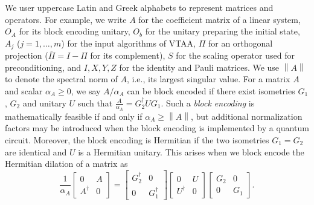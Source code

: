 \documentclass[letterpaper,onecolumn,11pt,accepted=2026-02-14]{quantumarticle}
\newcommand{\norm}[1]{\left\lVert#1\right\rVert}
\theoremstyle{remark}
\theoremstyle{plain}
\begin{document}
We user uppercase Latin and Greek alphabets to represent matrices and operators. For example, we write $A$ for the coefficient matrix of a linear system, $O_A$ for its block encoding unitary, $O_b$ for the unitary preparing the initial state, $A_j$ ($j=1,\ldots,m$) for the input algorithms of VTAA, $\Pi$ for an orthogonal projection ($\overline{\Pi}=I-\Pi$ for its complement), $S$ for the scaling operator used for preconditioning, and $I,X,Y,Z$ for the identity and Pauli matrices. We use $\norm{A}$ to denote the spectral norm of $A$, i.e., its largest singular value.
For a matrix $A$ and scalar $\alpha_A\geq 0$, we say $A/\alpha_A$ can be block encoded if there exist isometries $G_1$, $G_2$ and unitary $U$ such that $\frac{A}{\alpha_A}=G_2^\dagger UG_1$. Such a \emph{block encoding} is mathematically feasible if and only if $\alpha_A\geq\norm{A}$, but additional normalization factors may be introduced when the block encoding is implemented by a quantum circuit. Moreover, the block encoding is Hermitian if the two isometries $G_1=G_2$ are identical and $U$ is a Hermitian unitary. This arises when we block encode the Hermitian dilation of a matrix as
\begin{equation*}
    \frac{1}{\alpha_A}
    \begin{bmatrix}
        0 & A\\
        A^\dagger & 0
    \end{bmatrix}
    =\begin{bmatrix}
        G_2^\dagger & 0\\
        0 & G_1^\dagger
    \end{bmatrix}
    \begin{bmatrix}
        0 & U\\
        U^\dagger & 0
    \end{bmatrix}
    \begin{bmatrix}
        G_2 & 0\\
        0 & G_1
    \end{bmatrix}.
\end{equation*}
\end{document}
